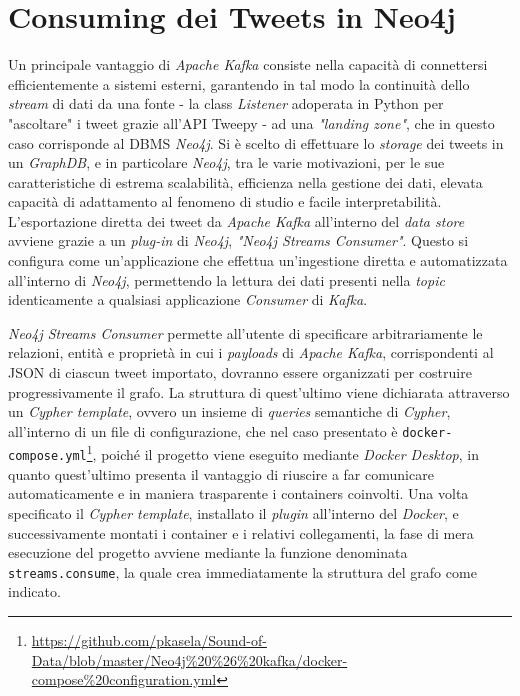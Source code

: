 \documentclass[12pt, a4paper, twocolumn]{article} %
\begin{document}
\section{Consuming dei Tweets in Neo4j}
Un principale vantaggio di \textit{Apache Kafka} consiste nella capacità di connettersi efficientemente a sistemi esterni, garantendo in tal modo la continuità dello \textit{stream} di dati da una fonte - la class \textit{Listener} adoperata in Python per "ascoltare" i tweet grazie all'API Tweepy - ad una \textit{"landing zone"}, che in questo caso corrisponde al DBMS \textit{Neo4j}. 
Si è scelto di effettuare lo \textit{storage} dei tweets in un \textit{GraphDB}, e in particolare \textit{Neo4j}, tra le varie motivazioni, per le sue caratteristiche di estrema scalabilità, efficienza nella gestione dei dati, elevata capacità di adattamento al fenomeno di studio e facile interpretabilità.
L'esportazione diretta dei tweet da \textit{Apache Kafka} all'interno del \textit{data store} avviene grazie a un \textit{plug-in} di \textit{Neo4j}, \textit{"Neo4j Streams Consumer"}. Questo si configura come un'applicazione che effettua un'ingestione diretta e automatizzata all'interno di \textit{Neo4j}, permettendo la lettura dei dati presenti nella \textit{topic} identicamente a qualsiasi applicazione \textit{Consumer} di \textit{Kafka}.

\textit{Neo4j Streams Consumer} permette all'utente di specificare arbitrariamente le relazioni, entità e proprietà in cui i \textit{payloads} di \textit{Apache Kafka}, corrispondenti al JSON di ciascun tweet importato, dovranno essere organizzati per costruire progressivamente il grafo.
La struttura di quest'ultimo viene dichiarata attraverso un \textit{Cypher template}, ovvero un insieme di \textit{queries} semantiche di \textit{Cypher}, all'interno di un file di configurazione, che nel caso presentato è \verb|docker-compose.yml|\footnote{\url{https://github.com/pkasela/Sound-of-Data/blob/master/Neo4j\%20\%26\%20kafka/docker-compose\%20configuration.yml}}, poiché il progetto viene eseguito mediante \textit{Docker Desktop}, in quanto quest'ultimo presenta il vantaggio di riuscire a far comunicare automaticamente e in maniera trasparente i containers coinvolti. 
Una volta specificato il \textit{Cypher template}, installato il \textit{plugin} all'interno del \textit{Docker}, e successivamente montati i container e i relativi collegamenti, la fase di mera esecuzione del progetto avviene mediante la funzione denominata \verb|streams.consume|, la quale crea immediatamente la struttura del grafo come indicato.
\end{document}
